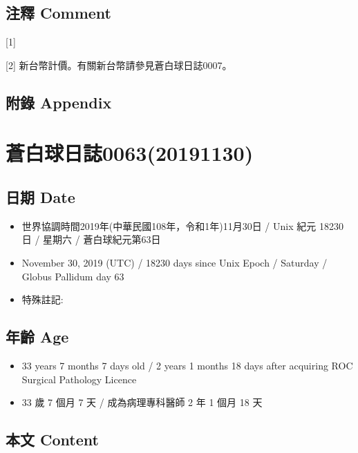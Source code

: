 \documentclass[a5paper, 12pt
]{book}
\providecommand{\tightlist}{%
  \setlength{\itemsep}{0pt}\setlength{\parskip}{0pt}}
\begin{document}
\hypertarget{ux6ce8ux91cb-comment-55}{%
\subsection{注釋 Comment}\label{ux6ce8ux91cb-comment-55}}

{[}1{]}

{[}2{]} 新台幣計價。有關新台幣請參見蒼白球日誌0007。

\hypertarget{ux9644ux9304-appendix-54}{%
\subsection{附錄 Appendix}\label{ux9644ux9304-appendix-54}}

\hypertarget{ux84bcux767dux7403ux65e5ux8a8c006320191130}{%
\section{蒼白球日誌0063(20191130)}\label{ux84bcux767dux7403ux65e5ux8a8c006320191130}}

\hypertarget{ux65e5ux671f-date-62}{%
\subsection{日期 Date}\label{ux65e5ux671f-date-62}}

\begin{itemize}
\tightlist
\item
  世界協調時間2019年(中華民國108年，令和1年)11月30日 / Unix 紀元 18230
  日 / 星期六 / 蒼白球紀元第63日
\item
  November 30, 2019 (UTC) / 18230 days since Unix Epoch / Saturday /
  Globus Pallidum day 63
\item
  特殊註記:
\end{itemize}

\hypertarget{ux5e74ux9f61-age-62}{%
\subsection{年齡 Age}\label{ux5e74ux9f61-age-62}}

\begin{itemize}
\tightlist
\item
  33 years 7 months 7 days old / 2 years 1 months 18 days after
  acquiring ROC Surgical Pathology Licence
\item
  33 歲 7 個月 7 天 / 成為病理專科醫師 2 年 1 個月 18 天
\end{itemize}

\hypertarget{ux672cux6587-content-62}{%
\subsection{本文 Content}\label{ux672cux6587-content-62}}
\end{document}
